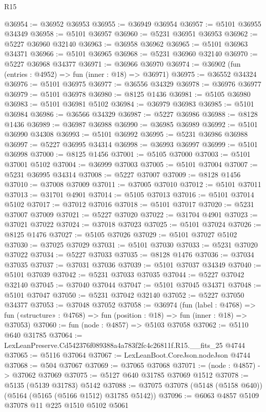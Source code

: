 \begin{lexlean}{R15}
\begin{coremodule}
{{{{{{{{{{{@36954 := @36952 @36953
@36955 := @36949 @36954
@36957 := @5101 @36955 @34349
@36958 := @5101 @36957
@36960 := @5231 @36951 @36953
@36962 := @5227 @36960 @32140
@36963 := @36958 @36962
@36965 := @5101 @36963 @34371
@36966 := @5101 @36965
@36968 := @5231 @36960 @32140
@36970 := @5227 @36968 @34377
@36971 := @36966 @36970
@36974 := @36902 (fun (entries : @4952) => fun (inner : @18) => @36971)
@36975 := @36552 @34324
@36976 := @5101 @36975
@36977 := @36556 @34329
@36978 := @36976 @36977
@36979 := @5101 @36978
@36980 := @8125 @1436
@36981 := @5105 @36980
@36983 := @5101 @36981 @5102
@36984 := @36979 @36983
@36985 := @5101 @36984
@36986 := @36566 @34329
@36987 := @5227 @36986
@36988 := @8128 @1436
@36989 := @36987 @36988
@36990 := @36985 @36989
@36992 := @5101 @36990 @34308
@36993 := @5101 @36992
@36995 := @5231 @36986 @36988
@36997 := @5227 @36995 @34314
@36998 := @36993 @36997
@36999 := @5101 @36998
@37000 := @8125 @1456
@37001 := @5105 @37000
@37003 := @5101 @37001 @5102
@37004 := @36999 @37003
@37005 := @5101 @37004
@37007 := @5231 @36995 @34314
@37008 := @5227 @37007
@37009 := @8128 @1456
@37010 := @37008 @37009
@37011 := @37005 @37010
@37012 := @5101 @37011
@37013 := @31701 @4901
@37014 := @5105 @37013
@37016 := @5101 @37014 @5102
@37017 := @37012 @37016
@37018 := @5101 @37017
@37020 := @5231 @37007 @37009
@37021 := @5227 @37020
@37022 := @31704 @4901
@37023 := @37021 @37022
@37024 := @37018 @37023
@37025 := @5101 @37024
@37026 := @8125 @1476
@37027 := @5105 @37026
@37029 := @5101 @37027 @5102
@37030 := @37025 @37029
@37031 := @5101 @37030
@37033 := @5231 @37020 @37022
@37034 := @5227 @37033
@37035 := @8128 @1476
@37036 := @37034 @37035
@37037 := @37031 @37036
@37039 := @5101 @37037 @34349
@37040 := @5101 @37039
@37042 := @5231 @37033 @37035
@37044 := @5227 @37042 @32140
@37045 := @37040 @37044
@37047 := @5101 @37045 @34371
@37048 := @5101 @37047
@37050 := @5231 @37042 @32140
@37052 := @5227 @37050 @34377
@37053 := @37048 @37052
@37058 := @36974
    (fun (label : @4768) =>
    fun («structure» : @4768) => fun (position : @18) => fun (inner : @18) => @37053)
@37060 := fun (node : @4857) => @5103 @37058
@37062 := @5110 @640 @31785
@37064 := LexLeanPreserve.Cd542376f089388a4a783f2fc4c26811f.R15.__fits_25 @4744
@37065 := @5116 @37064
@37067 := LexLeanBoot.CoreJson.nodeJson @4744
@37068 := @504 @37067
@37069 := @37065 @37068
@37071 := (node : @4857) -> @37062 @37069
@37075 := @5127 @640 @31785 @37069 @1512
@37078 := @5135 (@5139 @31783) @5142
@37088 := @37075 @37078 (@5148 (@5158 @640)) (@5164 (@5165 (@5166 @1512) @31785 @5142))
@37096 := @6063 @4857 @5109 @37078 @11 @225 @1510 @5102 @5061
}}}}}}}}}}}
\end{coremodule}
\end{lexlean}
